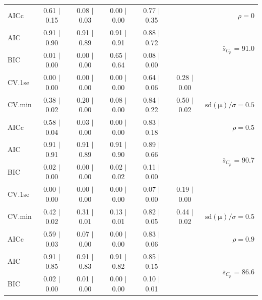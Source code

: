 \documentclass[12pt]{article}
\newcommand{\mr}[1]{\mathrm{#1}}
\newcommand{\bm}[1]{\mathbf{#1}}
\begin{document}
\begin{table}[p]
\begin{center}
\begin{tabular}{l*{5}{c}|r}
AICc & 0.61 $\mid$ 0.15 & 0.08 $\mid$ 0.03 & 0.00 $\mid$ 0.00 & 0.77 $\mid$ 0.35 & & $\rho=0$ \\
AIC & 0.91 $\mid$ 0.90 & 0.91 $\mid$ 0.89 & 0.91 $\mid$ 0.91 & 0.88 $\mid$ 0.72 & & \multirow{2}{*}{$\bar{s}_{C_p}$ = 91.0} \\
BIC & 0.01 $\mid$ 0.00 & 0.00 $\mid$ 0.00 & 0.65 $\mid$ 0.64 & 0.08 $\mid$ 0.00 & & \\
 \hline 
CV.1se & 0.00 $\mid$ 0.00 & 0.00 $\mid$ 0.00 & 0.00 $\mid$ 0.00 & 0.64 $\mid$ 0.06 & 0.28 $\mid$ 0.00 &\\
CV.min & 0.38 $\mid$ 0.02 & 0.20 $\mid$ 0.00 & 0.08 $\mid$ 0.00 & 0.84 $\mid$ 0.22 & 0.50 $\mid$ 0.02 &  $\mr{sd}(\bm{\mu})/\sigma=0.5$ \\
AICc & 0.58 $\mid$ 0.04 & 0.03 $\mid$ 0.00 & 0.00 $\mid$ 0.00 & 0.83 $\mid$ 0.18 & & $\rho=0.5$ \\
AIC & 0.91 $\mid$ 0.91 & 0.91 $\mid$ 0.89 & 0.91 $\mid$ 0.90 & 0.89 $\mid$ 0.66 & & \multirow{2}{*}{$\bar{s}_{C_p}$ = 90.7} \\
BIC & 0.02 $\mid$ 0.00 & 0.00 $\mid$ 0.00 & 0.02 $\mid$ 0.02 & 0.11 $\mid$ 0.00 & & \\
 \hline 
CV.1se & 0.00 $\mid$ 0.00 & 0.00 $\mid$ 0.00 & 0.00 $\mid$ 0.00 & 0.07 $\mid$ 0.00 & 0.19 $\mid$ 0.00 &\\
CV.min & 0.42 $\mid$ 0.02 & 0.31 $\mid$ 0.01 & 0.13 $\mid$ 0.01 & 0.82 $\mid$ 0.05 & 0.44 $\mid$ 0.02 &  $\mr{sd}(\bm{\mu})/\sigma=0.5$ \\
AICc & 0.59 $\mid$ 0.03 & 0.07 $\mid$ 0.00 & 0.00 $\mid$ 0.00 & 0.83 $\mid$ 0.06 & & $\rho=0.9$ \\
AIC & 0.91 $\mid$ 0.85 & 0.91 $\mid$ 0.83 & 0.91 $\mid$ 0.82 & 0.85 $\mid$ 0.15 & & \multirow{2}{*}{$\bar{s}_{C_p}$ = 86.6} \\
BIC & 0.02 $\mid$ 0.00 & 0.01 $\mid$ 0.00 & 0.00 $\mid$ 0.00 & 0.10 $\mid$ 0.01 & & \\
 \hline 
 \end{tabular}
\end{center}
\vspace{-1cm}
\end{table}


\end{document}
